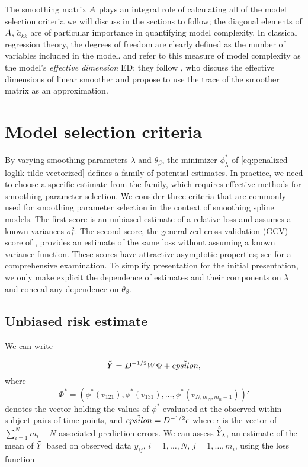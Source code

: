 The smoothing matrix $\tilde{A}$ plays an integral role of calculating all of the model selection criteria we will discuss in the sections to follow;  the diagonal elements of $\tilde{A}$, $\tilde{a}_{kk}$ are of particular importance in quantifying  model complexity. In classical regression theory, the degrees of freedom are clearly defined as the number of variables included in the model. \citet{eilers1996flexible} and\citet{marx2005multidimensional} refer to this measure of model complexity as the model's \emph{effective dimension} ED; they follow \citet{hastie1990generalized}, who discuss the effective dimensions of linear smoother and propose to use the trace of the smoother matrix as an approximation. 

\section{Model selection criteria}

By varying smoothing parameters $\lambda$ and $\theta_\beta$, the minimizer $\phi^*_\lambda$ of \ref{eq:penalized-loglik-tilde-vectorized} defines a family of potential estimates. In practice, we need to choose a specific estimate from the family, which requires effective methods for smoothing parameter selection. We consider three criteria that are commonly used for smoothing parameter selection in the context of smoothing spline models. The first score is an unbiased estimate of a relative loss and assumes a known variances $\sigma_t^2$. The second score, the generalized cross validation (GCV) score of \citet{craven1978smoothing}, provides an estimate of the same loss without assuming a known variance function. These scores have attractive asymptotic properties; see \citet{gu2013smoothing} for a comprehensive examination.   To simplify presentation for the initial presentation, we only make explicit the dependence of estimates and their components on $\lambda$ and conceal any dependence on $\theta_\beta$. 

\subsection{Unbiased risk estimate}

We can write

\begin{equation} 
\tilde{Y} = D^{-1/2}W \Phi + \tilde{epsilon},
\end{equation}
\noindent
where 
\[
\Phi^* = \left( \phi^*\left( v_{121} \right), \phi^*\left( v_{131} \right), \dots, \phi^*\left( v_{N,m_N, m_n -1} \right) \right)'
\]
\noindent
denotes the vector holding the values of $\phi^*$ evaluated at the observed within-subject pairs of time points, and $\tilde{epsilon} = D^{-1/2} \epsilon$ where $\epsilon$ is the vector of $\sum_{i = 1}^Nm_i - N$ associated prediction errors.  We can assess $\hat{\tilde{Y}}_\lambda$, an estimate of the mean of $\tilde{Y}$ based on observed data $y_{ij}$, $i = 1,\dots, N$, $j = 1,\dots, m_i$, using the loss function

